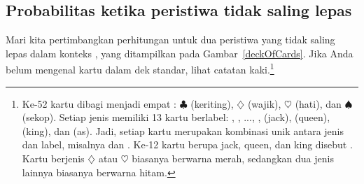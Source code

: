\subsection{Probabilitas ketika peristiwa tidak saling lepas}

Mari kita pertimbangkan perhitungan untuk dua peristiwa yang tidak saling lepas dalam konteks , yang ditampilkan pada Gambar~\ref{deckOfCards}. Jika Anda belum mengenal kartu dalam dek standar, lihat catatan kaki.\footnote{Ke-52 kartu dibagi menjadi empat : $\clubsuit$ (keriting), {\color{redcards}$\diamondsuit$} (wajik), {\color{redcards}$\heartsuit$} (hati), dan $\spadesuit$ (sekop). Setiap jenis memiliki 13 kartu berlabel: , , ..., ,  (jack),  (queen),  (king), dan  (as). Jadi, setiap kartu merupakan kombinasi unik antara jenis dan label, misalnya {\color{redcards}} dan . Ke-12 kartu berupa jack, queen, dan king disebut . Kartu berjenis {\color{redcards}$\diamondsuit$} atau {\color{redcards}$\heartsuit$} biasanya berwarna {\color{redcards}merah}, sedangkan dua jenis lainnya biasanya berwarna hitam.}

